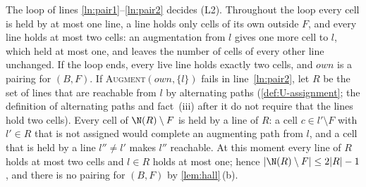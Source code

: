 The loop of lines \ref{ln:pair1}--\ref{ln:pair2} decides (L2). Throughout the loop every cell is held
by at most one line, a line holds only cells of its own outside $F$, and every line holds at most two
cells: an augmentation from $l$ gives one more cell to $l$, which held at most one, and leaves the
number of cells of every other line unchanged. If the loop ends, every live line holds exactly two
cells, and $\mathit{own}$ is a pairing for $(B,F)$. If \textsc{Augment}$(\mathit{own},\{l\})$ fails in
line~\ref{ln:pair2}, let $R$ be the set of lines that are reachable from $l$ by alternating paths
(\cref{def:U-assignment}; the definition of alternating paths and fact~(iii) after it do not require
that the lines hold two cells). Every cell of $\N(R)\setminus F$ is held by a line of $R$: a cell
$c\in l'\setminus F$ with $l'\in R$ that is not assigned would complete an augmenting path from $l$,
and a cell that is held by a line $l''\ne l'$ makes $l''$ reachable. At this moment every line of $R$
holds at most two cells and $l\in R$ holds at most one; hence $|\N(R)\setminus F|\le 2|R|-1$, and there
is no pairing for $(B,F)$ by \cref{lem:hall}\,(b).




